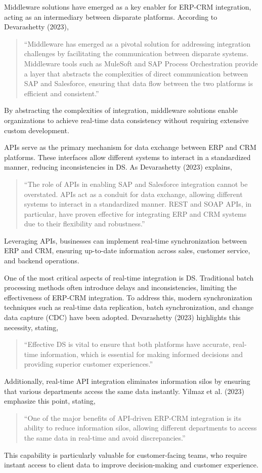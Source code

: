 Middleware solutions have emerged as a key enabler for ERP-CRM integration, acting as an intermediary between disparate platforms. According to Devarashetty (2023), 
\begin{quote}
    ``Middleware has emerged as a pivotal solution for addressing integration challenges by facilitating the communication between disparate systems. Middleware tools such as MuleSoft and SAP Process Orchestration provide a layer that abstracts the complexities of direct communication between SAP and Salesforce, ensuring that data flow between the two platforms is efficient and consistent.'' \cite{devarashetty2023}
\end{quote}
By abstracting the complexities of integration, middleware solutions enable organizations to achieve real-time data consistency without requiring extensive custom development.

APIs serve as the primary mechanism for data exchange between ERP and CRM platforms. These interfaces allow different systems to interact in a standardized manner, reducing inconsistencies in DS. As Devarashetty (2023) explains, 
\begin{quote}
    ``The role of APIs in enabling SAP and Salesforce integration cannot be overstated. APIs act as a conduit for data exchange, allowing different systems to interact in a standardized manner. REST and SOAP APIs, in particular, have proven effective for integrating ERP and CRM systems due to their flexibility and robustness.'' \cite{devarashetty2023}
\end{quote}
Leveraging APIs, businesses can implement real-time synchronization between ERP and CRM, ensuring up-to-date information across sales, customer service, and backend operations.

One of the most critical aspects of real-time integration is DS. Traditional batch processing methods often introduce delays and inconsistencies, limiting the effectiveness of ERP-CRM integration. To address this, modern synchronization techniques such as real-time data replication, batch synchronization, and change data capture (CDC) have been adopted. Devarashetty (2023) highlights this necessity, stating, 
\begin{quote}
    ``Effective DS is vital to ensure that both platforms have accurate, real-time information, which is essential for making informed decisions and providing superior customer experiences.'' \cite{devarashetty2023}
\end{quote}

Additionally, real-time API integration eliminates information silos by ensuring that various departments access the same data instantly. Yilmaz et al. (2023) emphasize this point, stating, 
\begin{quote}
    ``One of the major benefits of API-driven ERP-CRM integration is its ability to reduce information silos, allowing different departments to access the same data in real-time and avoid discrepancies.'' \cite{yilmaz2023}
\end{quote}
This capability is particularly valuable for customer-facing teams, who require instant access to client data to improve decision-making and customer experience.

